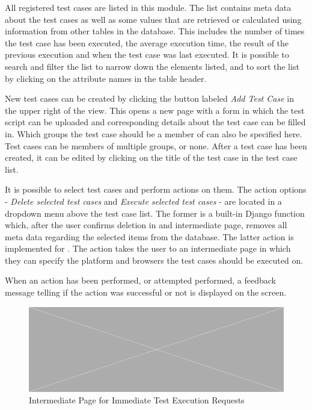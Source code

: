 All registered test cases are listed in this module. The list contains meta data about the test cases as well as some values that are retrieved or calculated using information from other tables in the database. This includes the number of times the test case has been executed, the average execution time, the result of the previous execution and when the test case was last executed. It is possible to search and filter the list to narrow down the elements listed, and to sort the list by clicking on the attribute names in the table header.

New test cases can be created by clicking the button labeled \emph{Add Test Case} in the upper right of the view. This opens a new page with a form in which the test script can be uploaded and corresponding details about the test case can be filled in. Which groups the test case should be a member of can also be specified here. Test cases can be members of multiple groups, or none. After a test case has been created, it can be edited by clicking on the title of the test case in the test case list.

It is possible to select test cases and perform actions on them. The action options - \emph{Delete selected test cases} and \emph{Execute selected test cases} - are located in a dropdown menu above the test case list. The former is a built-in Django function which, after the user confirms deletion in and intermediate page, removes all meta data regarding the selected items from the database. The latter action is implemented for \toolname. The action takes the user to an intermediate page in which they can specify the platform and browsers the test cases should be executed on.

When an action has been performed, or attempted performed, a feedback message telling if the action was successful or not is displayed on the screen.


\begin{figure}[h]
    \centering
    \includegraphics[width=\textwidth]{figures/placeholder.png}
    \caption{Intermediate Page for Immediate Test Execution Requests}
    \label{fig.tc_intermediate}
\end{figure}

